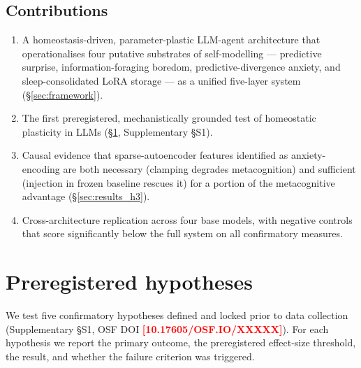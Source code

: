 \documentclass[pdflatex,sn-mathphys-num]{sn-jnl}
\newcommand{\PLACE}[1]{\textcolor{red}{\textbf{[#1]}}}
\theoremstyle{thmstyleone}
\theoremstyle{thmstylethree}
\begin{document}
\subsection*{Contributions}
\begin{enumerate}[leftmargin=2em]
\item A homeostasis-driven, parameter-plastic LLM-agent architecture that operationalises four putative substrates of self-modelling --- predictive surprise, information-foraging boredom, predictive-divergence anxiety, and sleep-consolidated LoRA storage --- as a unified five-layer system (\S\ref{sec:framework}).
\item The first preregistered, mechanistically grounded test of homeostatic plasticity in LLMs (\S\ref{sec:preregistration}, Supplementary §S1).
\item Causal evidence that sparse-autoencoder features identified as anxiety-encoding are both necessary (clamping degrades metacognition) and sufficient (injection in frozen baseline rescues it) for a portion of the metacognitive advantage (\S\ref{sec:results_h3}).
\item Cross-architecture replication across four base models, with negative controls that score significantly below the full system on all confirmatory measures.
\end{enumerate}

\section{Preregistered hypotheses}\label{sec:preregistration}

We test five confirmatory hypotheses defined and locked prior to data collection (Supplementary §S1, OSF DOI \PLACE{10.17605/OSF.IO/XXXXX}). For each hypothesis we report the primary outcome, the preregistered effect-size threshold, the result, and whether the failure criterion was triggered.
\end{document}
